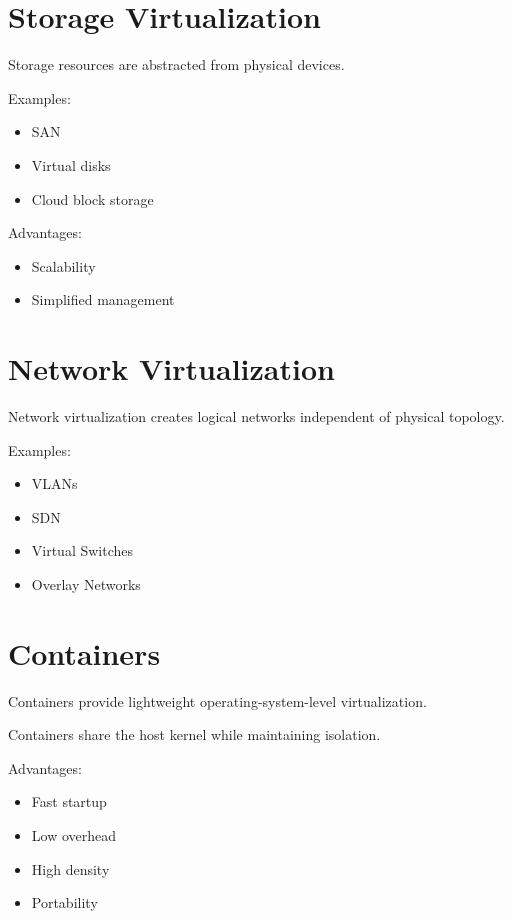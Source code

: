\section{Storage Virtualization}

Storage resources are abstracted from physical devices.

Examples:

\begin{itemize}
\item SAN
\item Virtual disks
\item Cloud block storage
\end{itemize}

Advantages:

\begin{itemize}
\item Scalability
\item Simplified management
\end{itemize}

\section{Network Virtualization}

Network virtualization creates logical networks independent of physical topology.

Examples:

\begin{itemize}
\item VLANs
\item SDN
\item Virtual Switches
\item Overlay Networks
\end{itemize}

\section{Containers}

Containers provide lightweight operating-system-level virtualization.

Containers share the host kernel while maintaining isolation.

Advantages:

\begin{itemize}
\item Fast startup
\item Low overhead
\item High density
\item Portability
\end{itemize}

